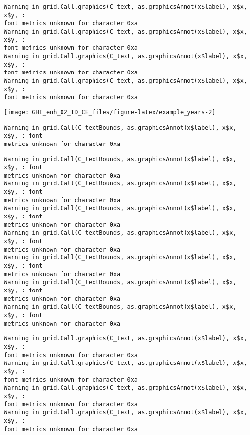 \documentclass[
  10pt,
  a4paper,oneside]{article}
\begin{document}
\begin{verbatim}
Warning in grid.Call.graphics(C_text, as.graphicsAnnot(x$label), x$x, x$y, :
font metrics unknown for character 0xa
Warning in grid.Call.graphics(C_text, as.graphicsAnnot(x$label), x$x, x$y, :
font metrics unknown for character 0xa
Warning in grid.Call.graphics(C_text, as.graphicsAnnot(x$label), x$x, x$y, :
font metrics unknown for character 0xa
Warning in grid.Call.graphics(C_text, as.graphicsAnnot(x$label), x$x, x$y, :
font metrics unknown for character 0xa
\end{verbatim}

\begin{center}\texttt{[image: GHI\_enh\_02\_ID\_CE\_files/figure-latex/example\_years-2]} \end{center}

\begin{verbatim}
Warning in grid.Call(C_textBounds, as.graphicsAnnot(x$label), x$x, x$y, : font
metrics unknown for character 0xa
\end{verbatim}

\begin{verbatim}
Warning in grid.Call(C_textBounds, as.graphicsAnnot(x$label), x$x, x$y, : font
metrics unknown for character 0xa
Warning in grid.Call(C_textBounds, as.graphicsAnnot(x$label), x$x, x$y, : font
metrics unknown for character 0xa
Warning in grid.Call(C_textBounds, as.graphicsAnnot(x$label), x$x, x$y, : font
metrics unknown for character 0xa
Warning in grid.Call(C_textBounds, as.graphicsAnnot(x$label), x$x, x$y, : font
metrics unknown for character 0xa
Warning in grid.Call(C_textBounds, as.graphicsAnnot(x$label), x$x, x$y, : font
metrics unknown for character 0xa
Warning in grid.Call(C_textBounds, as.graphicsAnnot(x$label), x$x, x$y, : font
metrics unknown for character 0xa
Warning in grid.Call(C_textBounds, as.graphicsAnnot(x$label), x$x, x$y, : font
metrics unknown for character 0xa
\end{verbatim}

\begin{verbatim}
Warning in grid.Call.graphics(C_text, as.graphicsAnnot(x$label), x$x, x$y, :
font metrics unknown for character 0xa
Warning in grid.Call.graphics(C_text, as.graphicsAnnot(x$label), x$x, x$y, :
font metrics unknown for character 0xa
Warning in grid.Call.graphics(C_text, as.graphicsAnnot(x$label), x$x, x$y, :
font metrics unknown for character 0xa
Warning in grid.Call.graphics(C_text, as.graphicsAnnot(x$label), x$x, x$y, :
font metrics unknown for character 0xa
\end{verbatim}
\end{document}

